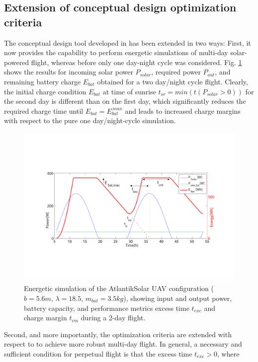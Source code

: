 \subsection{Extension of conceptual design optimization criteria}
\label{sec:ExtensionOptCriteria}
The conceptual design tool developed in \cite{Noth_PhD,Leutenegger_JIRS} has been extended in two ways: First, it now provides the capability to perform energetic simulations of multi-day solar-powered flight, whereas before only one day-night cycle was considered. Fig. \ref{fig:EnergySimulation} shows the results for incoming solar power $P_{solar}$, required power $P_{out}$, and remaining battery charge $E_{bat}$ obtained for a two day/night cycle flight. Clearly, the initial charge condition $E_{bat}$ at time of sunrise $t_{sr}=min(t(P_{solar}>0))$ for the second day is different than on the first day, which significantly reduces the required charge time until $E_{bat}=E_{bat}^{\,max}$ and leads to increased charge margins with respect to the pure one day/night-cycle simulation. %
\begin{figure}[tb]
    \centering
    \includegraphics[width=\linewidth]{images/2_EnergySimulation}
    \caption{Energetic simulation of the AtlantikSolar UAV configuration ($b=5.6m$, $\lambda=18.5$, $m_{bat}=3.5kg$), showing input and output power, battery capacity, and performance metrics excess time $t_{exc}$ and charge margin $t_{cm}$ during a 2-day flight.}
    \label{fig:EnergySimulation}
\end{figure}
Second, and more importantly, the optimization criteria are extended with respect to \cite{Noth_PhD,Leutenegger_JIRS} to achieve more robust multi-day flight. In general, a necessary and sufficient condition for perpetual flight is that the excess time $t_{exc}>0$, where 
